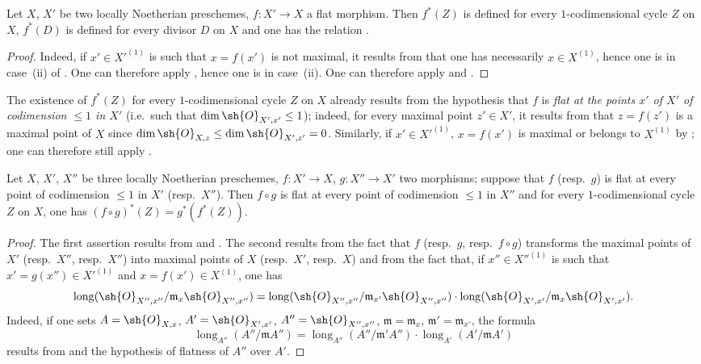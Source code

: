 \begin{proposition}[21.10.6]
\label{IV.21.10.6}
Let $X$, $X'$ be two locally Noetherian preschemes, $f:X'\to X$ a flat morphism.
Then $f^*(Z)$ is defined for every $1$-codimensional cycle $Z$ on $X$, $f^*(D)$ is defined for every divisor $D$ on $X$ and one has the relation .
\end{proposition}

\begin{proof}
Indeed, if $x'\in X'^{(1)}$ is such that $x=f(x')$ is not maximal, it results from  that one has necessarily $x\in X^{(1)}$, hence one is in case~(ii) of .
One can therefore apply , hence one is in case~(ii).
One can therefore apply  and .
\end{proof}

\begin{remark}[21.10.7]
\label{IV.21.10.7}
The existence of $f^*(Z)$ for every $1$-codimensional cycle $Z$ on $X$ already results from the hypothesis that $f$ is \emph{flat at the points $x'$ of $X'$ of codimension $\leq 1$ in $X'$} (i.e.\ such that $\dim\sh{O}_{X',x'}\leq 1$);
indeed, for every maximal point $z'\in X'$, it results from  that $z=f(z')$ is a maximal point of $X$ since $\dim\sh{O}_{X,z}\leq\dim\sh{O}_{X',z'}=0$.
Similarly, if $x'\in X'^{(1)}$, $x=f(x')$ is maximal or belongs to $X^{(1)}$ by ;
one can therefore still apply .
\end{remark}

\begin{proposition}[21.10.8]
\label{IV.21.10.8}
Let $X$, $X'$, $X''$ be three locally Noetherian preschemes, $f:X'\to X$, $g:X''\to X'$ two morphisms;
suppose that $f$ (resp.\ $g$) is flat at every point of codimension $\leq 1$ in $X'$ (resp.\ $X''$).
Then $f\circ g$ is flat at every point of codimension $\leq 1$ in $X''$ and for every $1$-codimensional cycle $Z$ on $X$, one has $(f\circ g)^*(Z)=g^*(f^*(Z))$.
\end{proposition}

\begin{proof}
The first assertion results from  and .
The second results from the fact that $f$ (resp.\ $g$, resp.\ $f\circ g$) transforms the maximal points of $X'$ (resp.\ $X''$, resp.\ $X''$) into maximal points of $X$ (resp.\ $X'$, resp.\ $X$) and from the fact that, if $x''\in X''^{(1)}$ is such that $x'=g(x'')\in X'^{(1)}$ and $x=f(x')\in X^{(1)}$, one has
\[
  \operatorname{long}(\sh{O}_{X'',x''}/\mathfrak{m}_x\sh{O}_{X'',x''})=\operatorname{long}(\sh{O}_{X'',x''}/\mathfrak{m}_{x'}\sh{O}_{X'',x''})\cdot\operatorname{long}(\sh{O}_{X',x'}/\mathfrak{m}_x\sh{O}_{X',x'}).
\]
Indeed, if one sets $A=\sh{O}_{X,x}$, $A'=\sh{O}_{X',x'}$, $A''=\sh{O}_{X'',x''}$, $\mathfrak{m}=\mathfrak{m}_x$, $\mathfrak{m}'=\mathfrak{m}_{x'}$, the formula
\[
  \operatorname{long}_{A''}(A''/\mathfrak{m} A'')=\operatorname{long}_{A''}(A''/\mathfrak{m}' A'')\cdot\operatorname{long}_{A'}(A'/\mathfrak{m} A')
\]
results from  and the hypothesis of flatness of $A''$ over $A'$.
\end{proof}

